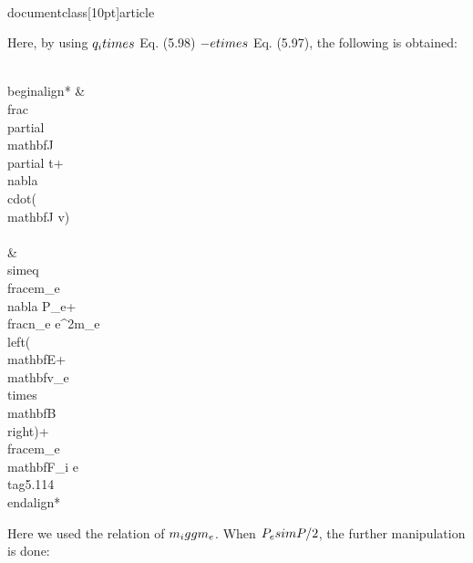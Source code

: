 \\documentclass[10pt]{article}
\begin{document}
{{{{Here, by using $q_{i} \\times$ Eq. (5.98) $-e \\times$ Eq. (5.97), the following is obtained:


\\begin{align*}
& \\frac{\\partial \\mathbf{J}}{\\partial t}+\\nabla \\cdot(\\mathbf{J v}) \\\\
& \\simeq \\frac{e}{m_{e}} \\nabla P_{e}+\\frac{n_{e} e^{2}}{m_{e}}\\left(\\mathbf{E}+\\mathbf{v}_{e} \\times \\mathbf{B}\\right)+\\frac{e}{m_{e}} \\mathbf{F}_{i e} \\tag{5.114}
\\end{align*}


Here we used the relation of $m_{i} \\gg m_{e}$. When $P_{e} \\sim P / 2$, the further manipulation is done:


}}}}
\end{document}
